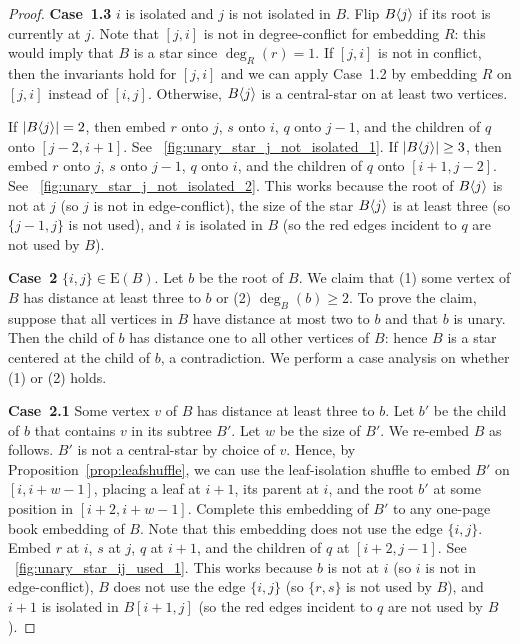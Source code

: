 \documentclass[11pt,a4paper,colorlinks=true,urlcolor=blue,citecolor=red]{article}
\theoremstyle{plain}
\newcommand{\case}[1]{\par\vspace{.5\baselineskip}\noindent\textbf{\sffamily Case~#1}}
\newcommand{\EB}{\mathrm{E}(B)}
\begin{document}
\begin{proof}
  \case{1.3} $i$ is isolated and $j$ is not isolated in $B$. Flip
  $B\langle{j}\rangle$ if its root is currently at $j$. Note that $[j,i]$ is not
  in degree-conflict for embedding $R$: this would imply that
  $B$ is a star since $\deg_R(r)=1$. If $[j,i]$ is not in
  conflict, then the invariants hold for $[j,i]$ and we can apply
  Case~1.2 by embedding $R$ on $[j,i]$ instead of $[i,j]$. Otherwise,
  $B\langle{j}\rangle$ is a central-star on at least two vertices.

  If $|B\langle{j}\rangle|=2$, then embed $r$ onto $j$, $s$ onto $i$, $q$ onto
  $j-1$, and the children of $q$ onto $[j-2,i+1]$. See
  \figurename~\ref{fig:unary_star_j_not_isolated_1}. If
  $|B\langle{j}\rangle|\geq3$, then embed $r$ onto $j$, $s$ onto $j-1$, $q$ onto
  $i$, and the children of $q$ onto $[i+1,j-2]$. See
  \figurename~\ref{fig:unary_star_j_not_isolated_2}. This works because
  the root of $B\langle{j}\rangle$ is not at $j$ (so $j$ is not in
  edge-conflict), the size of the star $B\langle{j}\rangle$ is at least three
  (so $\{j-1,j\}$ is not used), and $i$ is isolated in $B$ (so the
  red edges incident to $q$ are not used by $B$).

  \case{2} $\{i,j\}\in\EB$. Let $b$ be the root of $B$.
  We claim that (1) some vertex of $B$ has distance at least three
  to $b$ or (2) $\deg_{B}(b)\geq 2$. To prove the claim, suppose
  that all vertices in $B$ have distance at most two to $b$ and
  that $b$ is unary. Then the child of $b$ has distance one to all other
  vertices of $B$: hence $B$ is a star centered at the child
  of $b$, a contradiction. We perform a case analysis on whether (1) or
  (2) holds.

  \case{2.1} Some vertex $v$ of $B$ has distance at least three to
  $b$. Let $b'$ be the child of $b$ that contains $v$ in its subtree
  $B'$. Let $w$ be the size of $B'$. We re-embed $B$ as follows.
  $B'$ is not a central-star by choice of $v$. Hence, by
  Proposition~\ref{prop:leafshuffle}, we can use the leaf-isolation
  shuffle to embed $B'$ on $[i,i+w-1]$, placing a leaf at $i+1$, its
  parent at $i$, and the root $b'$ at some position in $[i+2,i+w-1]$.
  Complete this embedding of $B'$ to any one-page book embedding of
  $B$. Note that this embedding does not use the edge
  $\{i,j\}$. Embed $r$ at $i$, $s$ at $j$, $q$ at $i+1$, and the
  children of $q$ at $[i+2,j-1]$. See
  \figurename~\ref{fig:unary_star_ij_used_1}. This works because $b$ is
  not at $i$ (so $i$ is not in edge-conflict), $B$ does not use the
  edge $\{i,j\}$ (so $\{r,s\}$ is not used by $B$), and $i+1$ is
  isolated in $B[i+1,j]$ (so the red edges incident to $q$ are not used
  by $B$).


\end{proof}
\end{document}
